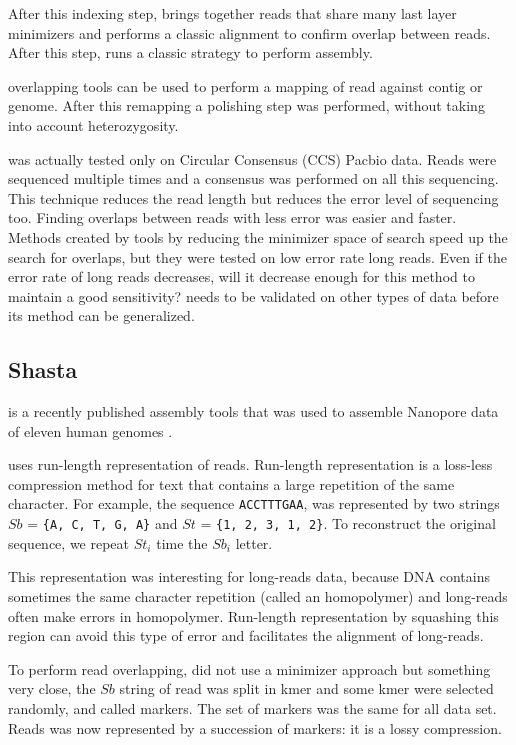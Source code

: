 \documentclass[main]{subfiles}
\begin{document}
After this indexing step, \shimmer brings together reads that share many last layer minimizers and performs a classic alignment to confirm overlap between reads. After this step, \peregrine runs a classic \OLC strategy to perform assembly.

\shimmer overlapping tools can be used to perform a mapping of read against contig or genome. After this remapping a polishing step was performed, without taking into account heterozygosity.

\peregrine was actually tested only on Circular Consensus (CCS) Pacbio data. Reads were sequenced multiple times and a consensus was performed on all this sequencing. This technique reduces the read length but reduces the error level of sequencing too. Finding overlaps between reads with less error was easier and faster. Methods created by \peregrine tools by reducing the minimizer space of search speed up the search for overlaps, but they were tested on low error rate long reads. Even if the error rate of long reads decreases, will it decrease enough for this method to maintain a good sensitivity? \peregrine needs to be validated on other types of data before its method can be generalized.

\subsection{Shasta}

\newcommand{\shasta}{}

\shasta is a recently published assembly tools that was used to assemble Nanopore data of eleven human genomes \cite{Shasta}.

\shasta uses run-length representation of reads. Run-length representation is a loss-less compression method for text that contains a large repetition of the same character. For example, the sequence \texttt{ACCTTTGAA}, was represented by two strings $Sb$ = \texttt{\{A, C, T, G, A\}} and $St$ = \texttt{\{1, 2, 3, 1, 2\}}. To reconstruct the original sequence, we repeat $St_i$ time the $Sb_i$ letter.

This representation was interesting for long-reads data, because DNA contains sometimes the same character repetition (called an homopolymer) and long-reads often make errors in homopolymer. Run-length representation by squashing this region can avoid this type of error and facilitates the alignment of long-reads.

To perform read overlapping, \shasta did not use a minimizer approach but something very close, the $Sb$ string of read was split in kmer and some kmer were selected randomly, and called markers. The set of markers was the same for all data set. Reads was now represented by a succession of markers: it is a lossy compression.
\end{document}
